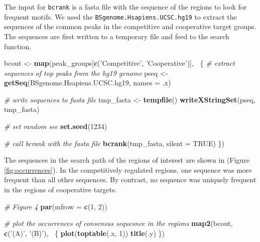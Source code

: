 \documentclass[9pt,a4paper,]{extarticle}
\newenvironment{Shaded}{\begin{snugshade}}{\end{snugshade}}
\newcommand{\CommentTok}[1]{\textcolor[rgb]{0.56,0.35,0.01}{\textit{#1}}}
\newcommand{\DataTypeTok}[1]{\textcolor[rgb]{0.13,0.29,0.53}{#1}}
\newcommand{\DecValTok}[1]{\textcolor[rgb]{0.00,0.00,0.81}{#1}}
\newcommand{\KeywordTok}[1]{\textcolor[rgb]{0.13,0.29,0.53}{\textbf{#1}}}
\newcommand{\NormalTok}[1]{#1}
\newcommand{\OperatorTok}[1]{\textcolor[rgb]{0.81,0.36,0.00}{\textbf{#1}}}
\newcommand{\OtherTok}[1]{\textcolor[rgb]{0.56,0.35,0.01}{#1}}
\newcommand{\StringTok}[1]{\textcolor[rgb]{0.31,0.60,0.02}{#1}}
\begin{document}
The input for \texttt{bcrank} is a fasta file with the sequence of the regions to look for frequent motifs. We used the \texttt{BSgenome.Hsapiens.UCSC.hg19} to extract the sequences of the common peaks in the competitive and cooperative target groups. The sequences are first written to a temporary file and feed to the search function.

\begin{Shaded}
\begin{Highlighting}[]
\NormalTok{bcout <-}\StringTok{ }\KeywordTok{map}\NormalTok{(peak_groups[}\KeywordTok{c}\NormalTok{(}\StringTok{'Competitive'}\NormalTok{, }\StringTok{'Cooperative'}\NormalTok{)], }\OperatorTok{~}\NormalTok{\{}
    \CommentTok{# extract sequences of top peaks from the hg19 genome}
\NormalTok{    pseq <-}\StringTok{ }\KeywordTok{getSeq}\NormalTok{(BSgenome.Hsapiens.UCSC.hg19, }\DataTypeTok{names =}\NormalTok{ .x)}
                 
    \CommentTok{# write sequences to fasta file}
\NormalTok{    tmp_fasta <-}\StringTok{ }\KeywordTok{tempfile}\NormalTok{()}
    \KeywordTok{writeXStringSet}\NormalTok{(pseq, tmp_fasta)}
                 
    \CommentTok{# set random see}
    \KeywordTok{set.seed}\NormalTok{(}\DecValTok{1234}\NormalTok{)}
                  
    \CommentTok{# call bcrank with the fasta file}
    \KeywordTok{bcrank}\NormalTok{(tmp_fasta, }\DataTypeTok{silent =} \OtherTok{TRUE}\NormalTok{)}
\NormalTok{\})}
\end{Highlighting}
\end{Shaded}

The sequences in the search path of the regions of interest are shown in (Figure \ref{fig:occurrences}). In the competitively regulated regions, one sequence was more frequent than all other sequences. By contrast, no sequence was uniquely frequent in the regions of cooperative targets.

\begin{Shaded}
\begin{Highlighting}[]
\CommentTok{# Figure 4}
\KeywordTok{par}\NormalTok{(}\DataTypeTok{mfrow =} \KeywordTok{c}\NormalTok{(}\DecValTok{1}\NormalTok{, }\DecValTok{2}\NormalTok{))}

\CommentTok{# plot the occurrences of consensus sequesnce in the regions}
\KeywordTok{map2}\NormalTok{(bcout, }\KeywordTok{c}\NormalTok{(}\StringTok{'(A)'}\NormalTok{, }\StringTok{'(B)'}\NormalTok{), }\OperatorTok{~}\NormalTok{\{}
    \KeywordTok{plot}\NormalTok{(}\KeywordTok{toptable}\NormalTok{(.x, }\DecValTok{1}\NormalTok{))}
    \KeywordTok{title}\NormalTok{(.y)}
\NormalTok{\})}
\end{Highlighting}
\end{Shaded}
\end{document}
